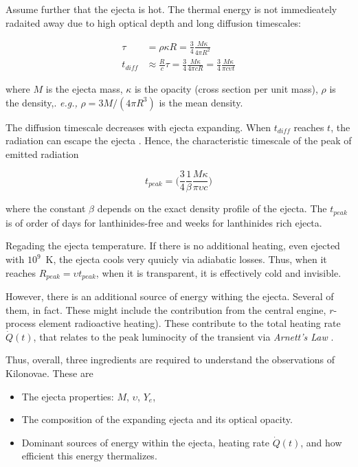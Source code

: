 \documentclass[11pt,a4paper,headinclude=true,DIV=14,BCOR=8mm,chapterprefix,listof=totoc,twoside,openright,abstracton]{scrbook}
\begin{document}
Assume further that the ejecta is hot. The thermal energy is not immedieately radaited away due to high optical depth and long diffusion timescales:

\begin{align}
    \tau &= \rho \kappa R = \frac{3}{4}\frac{M\kappa}{4\pi R^2}\\ 
    t_{diff} &\approx \frac{R}{c}\tau = \frac{3}{4}\frac{M\kappa}{4\pi c R} = \frac{3}{4}\frac{M\kappa}{\pi c \upsilon t}
\end{align}

where $M$ is the ejecta mass, $\kappa$ is the opacity (cross section per unit mass), $\rho$ is the density,. \textit{e.g.,} $\rho=3M/(4\pi R^3)$ is the mean density.

The diffusion timescale decreases with ejecta expanding. 
When $t_{diff}$ reaches $t$, the radiation can escape the ejecta \cite{Arnett 1982}. Hence, the characteristic timescale of the peak of emitted radiation 

\begin{equation}
    t_{peak} = \Big(\frac{3}{4}\frac{1}{\beta}\frac{M\kappa}{\pi \upsilon c}\Big)
\end{equation}

where the constant $\beta$ depends on the exact density profile of the ejecta. 
The $t_{peak}$ is of order of days for lanthinides-free and weeks for lanthinides rich ejecta.

Regading the ejecta temperature. If there is no additional heating, even ejected with $10^9$~K, the ejecta cools very quuicly via adiabatic losses. Thus, when it reaches $R_{peak} = \upsilon t_{peak}$, when it is transparent, it is effectively cold and invisible. 

However, there is an additional source of energy withing the ejecta. Several of them, in fact. These might include the contribution from the central engine, $r$-process element radioactive heating). These contribute to the total heating rate $\dot{Q}(t)$, that relates to the peak luminocity of the transient via \textit{Arnett's Law} \cite{(Arnett 1982)}.

Thus, overall, three ingredients are required to understand the observations of Kilonovae. These are 
\begin{itemize}
    \item The ejecta properties: $M$, $\upsilon$, $Y_e$,
    \item The composition of the expanding ejecta and its optical opacity.
    \item Dominant sources of energy within the ejecta, heating rate $\dot{Q}(t)$, and how efficient this energy thermalizes.
\end{itemize}
\end{document}
